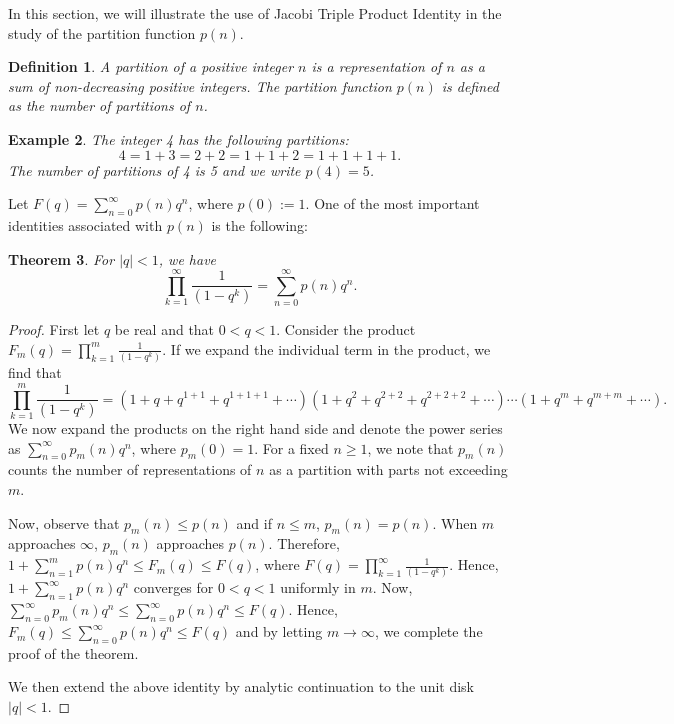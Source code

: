 \documentclass{article}
\newtheorem{theorem}{Theorem}[section]
\newtheorem{definition}[theorem]{Definition}
\newtheorem{example}[theorem]{Example}
\begin{document}
In this section, we will illustrate the use of Jacobi Triple Product Identity in the
study of the partition function $p(n)$.

\begin{definition}
A partition of a positive integer $n$ is a representation of $n$ as
a sum of non-decreasing positive integers. The partition function $p(n)$ is defined
as the number of partitions of $n$.
\end{definition}

\begin{example}
The integer 4 has the following partitions:
\[
4 = 1 + 3 = 2 + 2 = 1 + 1 + 2 = 1 + 1 + 1 + 1.
\]
The number of partitions of 4 is 5 and we write $p(4) = 5$.
\end{example}

Let $F(q) = \sum_{n=0}^{\infty} p(n) q^n$, where $p(0) := 1$. One of the most important identities
associated with $p(n)$ is the following:

\begin{theorem}
For $|q| < 1$, we have
\begin{equation}
\prod_{k=1}^{\infty} \frac{1}{(1-q^k)} = \sum_{n=0}^{\infty} p(n) q^n.
\tag{9.23}
\end{equation}
\end{theorem}

\begin{proof}
First let $q$ be real and that $0 < q < 1$. Consider the product
$F_m(q) = \prod_{k=1}^{m} \frac{1}{(1-q^k)}$.
If we expand the individual term in the product, we find that
\[
\prod_{k=1}^{m} \frac{1}{(1-q^k)} = (1 + q + q^{1+1} + q^{1+1+1} + \cdots)(1 + q^2 + q^{2+2} + q^{2+2+2} + \cdots)\cdots
(1 + q^m + q^{m+m} + \cdots).
\]
We now expand the products on the right hand side and denote the power series as
$\sum_{n=0}^{\infty} p_m(n) q^n$,
where $p_m(0) = 1$. For a fixed $n \geq 1$, we note that $p_m(n)$ counts the number
of representations of $n$ as a partition with parts not exceeding $m$.

Now, observe that $p_m(n) \leq p(n)$ and if $n \leq m$, $p_m(n) = p(n)$.
When $m$ approaches $\infty$, $p_m(n)$ approaches $p(n)$. Therefore,
$1 + \sum_{n=1}^{m} p(n) q^n \leq F_m(q) \leq F(q)$,
where $F(q) = \prod_{k=1}^{\infty} \frac{1}{(1-q^k)}$.
Hence, $1 + \sum_{n=1}^{\infty} p(n) q^n$ converges for $0 < q < 1$ uniformly in $m$. Now,
$\sum_{n=0}^{\infty} p_m(n) q^n \leq \sum_{n=0}^{\infty} p(n) q^n \leq F(q)$.
Hence, $F_m(q) \leq \sum_{n=0}^{\infty} p(n) q^n \leq F(q)$
and by letting $m \to \infty$, we complete the proof of the theorem.

We then extend the above identity by analytic continuation to the unit disk $|q| < 1$.
\end{proof}
\end{document}
